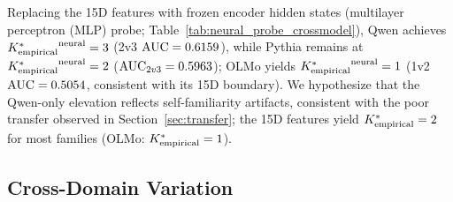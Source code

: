 Replacing the 15D features with frozen encoder hidden states (multilayer perceptron (MLP) probe; Table~\ref{tab:neural_probe_crossmodel}), Qwen achieves ${K^*_{\text{empirical}}}^{\text{neural}} = 3$ (2v3 $\text{AUC} = 0.6159$), while Pythia remains at ${K^*_{\text{empirical}}}^{\text{neural}} = 2$ ($\text{AUC}_{2v3} = 0.5963$); OLMo yields ${K^*_{\text{empirical}}}^{\text{neural}} = 1$ (1v2 $\text{AUC} = 0.5054$, consistent with its 15D boundary).
We hypothesize that the Qwen-only elevation reflects self-familiarity artifacts, consistent with the poor transfer observed in Section~\ref{sec:transfer}; the 15D features yield ${K^*_{\text{empirical}}} = 2$ for most families (OLMo: ${K^*_{\text{empirical}}} = 1$).

\begin{table}[t]
\centering
\footnotesize
\caption{Neural probe pairwise AUC using frozen-encoder MLP. Each cell reports AUC for classifying depth $d$ vs.\ $d{+}1$ text. $\Kempirical^{\text{neural}}$: maximum depth where AUC exceeds $\theta = 0.60$.}
\label{tab:neural_probe_crossmodel}
\end{table}

\subsection{Cross-Domain Variation}
\label{sec:cross_domain}

